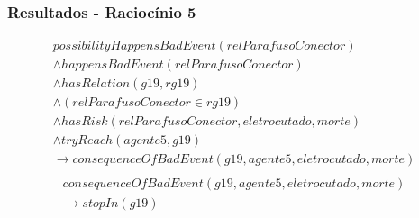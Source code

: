 \documentclass{beamer}
\begin{document}
\begin{frame}
	\frametitle{Resultados - Raciocínio 5}
	\begin{eqnarray}\nonumber
	    possibilityHappensBadEvent(relParafusoConector) \nonumber \\
	    \wedge happensBadEvent(relParafusoConector) \nonumber \\ 
	    \wedge hasRelation(g19,rg19)  \nonumber \\  
	    \wedge (relParafusoConector \in rg19) \nonumber \\ 
	    \wedge hasRisk(relParafusoConector,eletrocutado,morte) \nonumber \\  
	    \wedge tryReach(agente5,g19) \nonumber \\ 
	    \to consequenceOfBadEvent(g19,agente5,eletrocutado,morte) \\ \nonumber
	\end{eqnarray}
	\begin{eqnarray}
		consequenceOfBadEvent(g19,agente5,eletrocutado,morte) \nonumber \\ 
		\to stopIn(g19)
	\end{eqnarray}
\end{frame}
\end{document}

